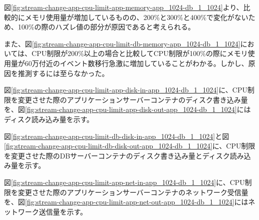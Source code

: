 \documentclass[../../../../main]{subfiles}
\begin{document}
    

    

    図\ref{fig:stream-change-app-cpu-limit-app-memory-app_1024-db_1_1024}より、比較的にメモリ使用量が増加しているものの、200\%と300\%と400\%で変化がないため、100\%の際のハズレ値の部分が原因であると考えられる。

    また、図\ref{fig:stream-change-app-cpu-limit-db-memory-app_1024-db_1_1024}においては、CPU制限が200\%以上の場合と比較してCPU制限が100\%の際にメモリ使用量が60万付近のイベント数移行急激に増加していることがわかる。しかし、原因を推測するには至らなかった。


    図\ref{fig:stream-change-app-cpu-limit-app-disk-in-app_1024-db_1_1024}に、CPU制限を変更させた際のアプリケーションサーバーコンテナのディスク書き込み量を、図\ref{fig:stream-change-app-cpu-limit-app-disk-out-app_1024-db_1_1024}にはディスク読み込み量を示す。

    
    

    図\ref{fig:stream-change-app-cpu-limit-db-disk-in-app_1024-db_1_1024}と図\ref{fig:stream-change-app-cpu-limit-db-disk-out-app_1024-db_1_1024}に、CPU制限を変更させた際のDBサーバーコンテナのディスク書き込み量とディスク読み込み量を示す。

    
    


    図\ref{fig:stream-change-app-cpu-limit-app-net-in-app_1024-db_1_1024}に、CPU制限を変更させた際のアプリケーションサーバーコンテナのネットワーク受信量を、図\ref{fig:stream-change-app-cpu-limit-app-net-out-app_1024-db_1_1024}にはネットワーク送信量を示す。

    
    
\end{document}
